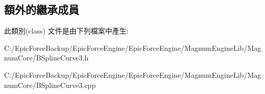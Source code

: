 \subsection*{額外的繼承成員}


此類別(class) 文件是由下列檔案中產生\+:\begin{DoxyCompactItemize}
\item 
C\+:/\+Epic\+Force\+Backup/\+Epic\+Force\+Engine/\+Epic\+Force\+Engine/\+Magnum\+Engine\+Lib/\+Magnum\+Core/B\+Spline\+Curve3.\+h\item 
C\+:/\+Epic\+Force\+Backup/\+Epic\+Force\+Engine/\+Epic\+Force\+Engine/\+Magnum\+Engine\+Lib/\+Magnum\+Core/B\+Spline\+Curve3.\+cpp\end{DoxyCompactItemize}
